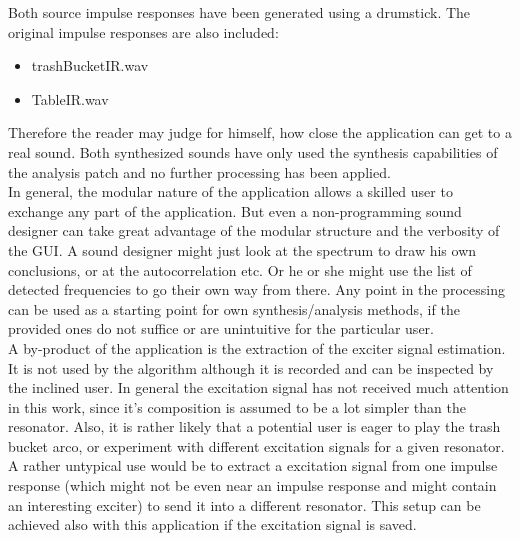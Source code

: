 Both source impulse responses have been generated using a drumstick.
The original impulse responses are also included:
\begin{itemize}
	\item trashBucketIR.wav  
	\item TableIR.wav
\end{itemize}
Therefore the reader may judge for himself, how close the application can get to a real sound. Both synthesized sounds have only used the synthesis capabilities of the analysis patch and no further processing has been applied.\\
In general, the modular nature of the application allows a skilled user to exchange any part of the application. But even a non-programming sound designer can take great advantage of the modular structure and the verbosity of the GUI. A sound designer might just look at the spectrum to draw his own conclusions, or at the autocorrelation etc. Or he or she might use the list of detected frequencies to go their own way from there. Any point in the processing can be used as a starting point for own synthesis/analysis methods, if the provided ones do not suffice or are unintuitive for the particular user.\\
A by-product of the application is the extraction of the exciter signal estimation. It is not used by the algorithm although it is recorded and can be inspected by the inclined user. In general the excitation signal has not received much attention in this work, since it's composition is assumed to be a lot simpler than the resonator. Also, it is rather likely that a potential user is eager to play the trash bucket arco, or experiment with different excitation signals for a given resonator. A rather untypical use would be to extract a excitation signal from one impulse response (which might not be even near an impulse response and might contain an interesting exciter) to send it into a different resonator. This setup can be achieved also with this application if the excitation signal is saved. 







